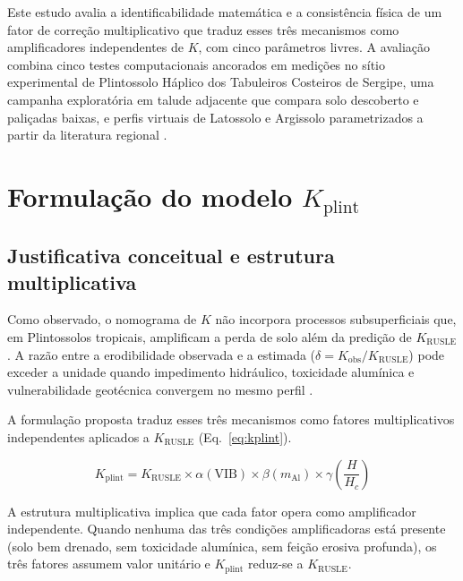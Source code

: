 \documentclass[preprint,review,12pt,authoryear]{elsarticle}
\begin{document}
Este estudo avalia a identificabilidade matemática e a consistência física de um fator de correção multiplicativo que traduz esses três mecanismos como amplificadores independentes de $K$, com cinco parâmetros livres. A avaliação combina cinco testes computacionais ancorados em medições no sítio experimental de Plintossolo Háplico dos Tabuleiros Costeiros de Sergipe, uma campanha exploratória em talude adjacente que compara solo descoberto e paliçadas baixas, e perfis virtuais de Latossolo e Argissolo parametrizados a partir da literatura regional \citep{silva_et_al_2009,bertoni_lombardi_neto_2017}.

\section{Formulação do modelo $K_{\mathrm{plint}}$}
\label{sec:model}

\subsection{Justificativa conceitual e estrutura multiplicativa}

Como observado, o nomograma de $K$ não incorpora processos subsuperficiais que, em Plintossolos tropicais, amplificam a perda de solo além da predição de $K_{\mathrm{RUSLE}}$. A razão entre a erodibilidade observada e a estimada ($\delta = K_{\mathrm{obs}}/K_{\mathrm{RUSLE}}$) pode exceder a unidade quando impedimento hidráulico, toxicidade alumínica e vulnerabilidade geotécnica convergem no mesmo perfil \citep{poesen_2018}. 

A formulação proposta traduz esses três mecanismos como fatores multiplicativos independentes aplicados a $K_{\mathrm{RUSLE}}$ (Eq.~\ref{eq:kplint}).

\begin{equation}
K_{\mathrm{plint}} = K_{\mathrm{RUSLE}} \times \alpha(\mathrm{VIB}) \times \beta(m_{\mathrm{Al}}) \times \gamma\!\left(\frac{H}{H_c}\right)
\label{eq:kplint}
\end{equation}

A estrutura multiplicativa implica que cada fator opera como amplificador independente. Quando nenhuma das três condições amplificadoras está presente (solo bem drenado, sem toxicidade alumínica, sem feição erosiva profunda), os três fatores assumem valor unitário e $K_{\mathrm{plint}}$ reduz-se a $K_{\mathrm{RUSLE}}$. 
\end{document}
